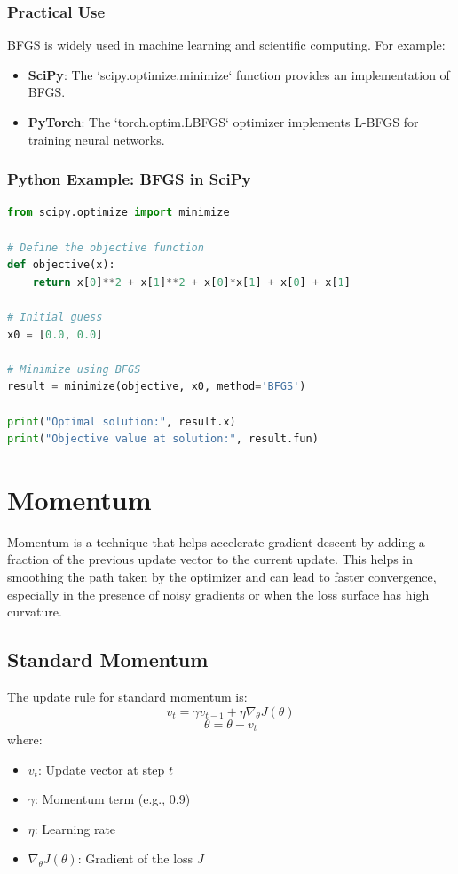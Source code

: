 \begin{notechapter}
\subsubsection{Practical Use}
BFGS is widely used in machine learning and scientific computing. For example:
\begin{itemize}
    \item \textbf{SciPy}: The `scipy.optimize.minimize` function provides an 
          implementation of BFGS.
    \item \textbf{PyTorch}: The `torch.optim.LBFGS` optimizer implements L-BFGS for 
          training neural networks.
\end{itemize}

\subsubsection{Python Example: BFGS in SciPy}
\begin{lstlisting}[language=Python]
from scipy.optimize import minimize

# Define the objective function
def objective(x):
    return x[0]**2 + x[1]**2 + x[0]*x[1] + x[0] + x[1]

# Initial guess
x0 = [0.0, 0.0]

# Minimize using BFGS
result = minimize(objective, x0, method='BFGS')

print("Optimal solution:", result.x)
print("Objective value at solution:", result.fun)
\end{lstlisting}

\section{Momentum}
Momentum is a technique that helps accelerate gradient descent
by adding a fraction of the previous update vector to the current
update. This helps in smoothing the path taken by the optimizer
and can lead to faster convergence, especially in the presence
of noisy gradients or when the loss surface has high curvature.

\subsection{Standard Momentum}
The update rule for standard momentum is:
\[
v_t = \gamma v_{t-1} + \eta \nabla_\theta J(\theta)
\]
\[
\theta = \theta - v_t
\]
where:
\begin{itemize}
    \item \(v_t\): Update vector at step \(t\)
    \item \(\gamma\): Momentum term (e.g., 0.9)
    \item \(\eta\): Learning rate
    \item \(\nabla_\theta J(\theta)\): Gradient of the loss \(J\)
\end{itemize}


\end{notechapter}
